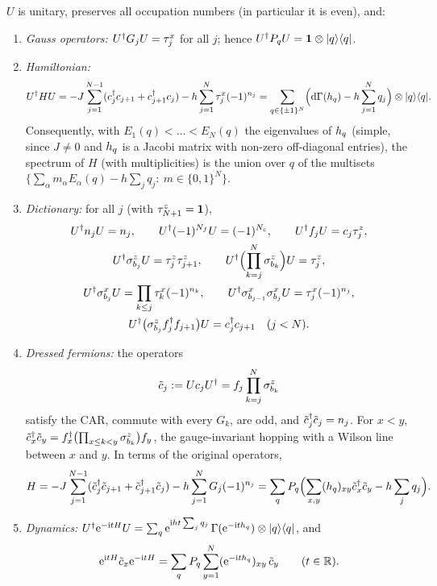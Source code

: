 \begin{theorem}\label{thm:duality}
$U$ is unitary, preserves all occupation numbers (in particular it is even), and:
\begin{enumerate}[label=(\alph*)]
\item \emph{Gauss operators:} $U^\dagger G_jU=\tau^{x}_{j}$ for all $j$; hence
$U^\dagger P_qU=\mathbf{1}\otimes|q\rangle\langle q|$.
\item \emph{Hamiltonian:}
\begin{equation}\label{eq:dualH}
  U^\dagger HU=-J\sum_{j=1}^{N-1}(c_j^\dagger c_{j+1}+c_{j+1}^\dagger c_j)-h\sum_{j=1}^N\tau^{x}_{j}(-1)^{n_j}
  =\sum_{q\in\{\pm1\}^N}\Bigl(\mathrm{d}\Gamma(h_{q})-h\sum_{j=1}^Nq_j\Bigr)\otimes|q\rangle\langle q|.
\end{equation}
Consequently, with $E_1(q)<\dots<E_N(q)$ the eigenvalues of $h_{q}$ (simple, since $J\neq0$ and $h_{q}$ is a
Jacobi matrix with non-zero off-diagonal entries), the spectrum of $H$ (with
multiplicities) is the union over $q$ of the multisets
$\{\sum_\alpha m_\alpha E_\alpha(q)-h\sum_jq_j:\ m\in\{0,1\}^N\}$.
\item \emph{Dictionary:} for all $j$ (with $\tau^{z}_{N+1}=\mathbf{1}$),
\begin{gather*}
  U^\dagger n_jU=n_j,\qquad U^\dagger(-1)^{N_f}U=(-1)^{N_c},\qquad U^\dagger f_jU=c_j\tau^{z}_{j},\\
  U^\dagger\sigma^{z}_{b_{j}}U=\tau^{z}_{j}\tau^{z}_{j+1},\qquad
  U^\dagger\Bigl(\prod_{k=j}^N\sigma^{z}_{b_{k}}\Bigr)U=\tau^{z}_{j},\\
  U^\dagger\sigma^{x}_{b_{j}}U=\prod_{k\le j}\tau^{x}_{k}(-1)^{n_k},\qquad
  U^\dagger\sigma^{x}_{b_{j-1}}\sigma^{x}_{b_{j}}U=\tau^{x}_{j}(-1)^{n_j},\\
  U^\dagger\bigl(\sigma^{z}_{b_{j}}f_j^\dagger f_{j+1}\bigr)U=c_j^\dagger c_{j+1}\quad(j<N).
\end{gather*}
\item \emph{Dressed fermions:} the operators
\begin{equation}\label{eq:dressed}
  \tilde c_j:=Uc_jU^\dagger=f_j\prod_{k=j}^{N}\sigma^{z}_{b_{k}}
\end{equation}
satisfy the CAR, commute with every $G_k$, are odd, and $\tilde c_j^\dagger\tilde c_j=n_j$.  For $x<y$,
$\tilde c_x^\dagger\tilde c_y=f_x^\dagger\bigl(\prod_{x\le k<y}\sigma^{z}_{b_{k}}\bigr)f_y$, the gauge-invariant
hopping with a Wilson line between $x$ and $y$.  In terms of the original operators,
\begin{equation}\label{eq:Hdressed}
  H=-J\sum_{j=1}^{N-1}(\tilde c_j^\dagger\tilde c_{j+1}+\tilde c_{j+1}^\dagger\tilde c_j)-h\sum_{j=1}^NG_j(-1)^{n_j}
   =\sum_q P_q\Bigl(\sum_{x,y}(h_{q})_{xy}\tilde c_x^\dagger\tilde c_y-h\sum_jq_j\Bigr).
\end{equation}
\item \emph{Dynamics:}
$U^\dagger\mathrm{e}^{-\mathrm{i} tH}U=\sum_q\mathrm{e}^{\mathrm{i} ht\sum_jq_j}\,\Gamma(\mathrm{e}^{-\mathrm{i} th_{q}})\otimes|q\rangle\langle q|$, and
\begin{equation}\label{eq:heisenberg}
  \mathrm{e}^{\mathrm{i} tH}\tilde c_x\mathrm{e}^{-\mathrm{i} tH}=\sum_qP_q\sum_{y=1}^N(\mathrm{e}^{-\mathrm{i} th_{q}})_{xy}\,\tilde c_y\qquad(t\in\mathbb{R}).
\end{equation}
\end{enumerate}
\end{theorem}

